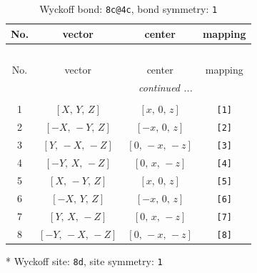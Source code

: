 \documentclass[fleqn,8pt]{jsarticle}
\begin{document}
\renewcommand{\arraystretch}{1.2}
\begin{longtable}{cccc}
\caption{Wyckoff bond: {\tt 8c@4c}, bond symmetry: {\tt 1}}
 \\
 \hline \hline
No. & vector & center & mapping \\ \hline \endfirsthead

\multicolumn{3}{l}{\tablename\ \thetable{}} \\
 \hline \hline
No. & vector & center & mapping \\ \hline \endhead

 \hline \hline
\multicolumn{3}{r}{\footnotesize\it continued ...} \\ \endfoot

 \hline \hline
\multicolumn{3}{r}{} \\ \endlastfoot

1 & $\left[ X,\, Y,\, Z \right]$ & $\left[ x,\, 0,\, z \right]$ & {\tt [1]} \\ \hline
2 & $\left[ - X,\, - Y,\, Z \right]$ & $\left[ - x,\, 0,\, z \right]$ & {\tt [2]} \\ \hline
3 & $\left[ Y,\, - X,\, - Z \right]$ & $\left[ 0,\, - x,\, - z \right]$ & {\tt [3]} \\ \hline
4 & $\left[ - Y,\, X,\, - Z \right]$ & $\left[ 0,\, x,\, - z \right]$ & {\tt [4]} \\ \hline
5 & $\left[ X,\, - Y,\, Z \right]$ & $\left[ x,\, 0,\, z \right]$ & {\tt [5]} \\ \hline
6 & $\left[ - X,\, Y,\, Z \right]$ & $\left[ - x,\, 0,\, z \right]$ & {\tt [6]} \\ \hline
7 & $\left[ Y,\, X,\, - Z \right]$ & $\left[ 0,\, x,\, - z \right]$ & {\tt [7]} \\ \hline
8 & $\left[ - Y,\, - X,\, - Z \right]$ & $\left[ 0,\, - x,\, - z \right]$ & {\tt [8]} \\
\end{longtable}
* Wyckoff site: {\tt 8d}, site symmetry: {\tt 1}
\renewcommand{\arraystretch}{1.2}
\end{document}
